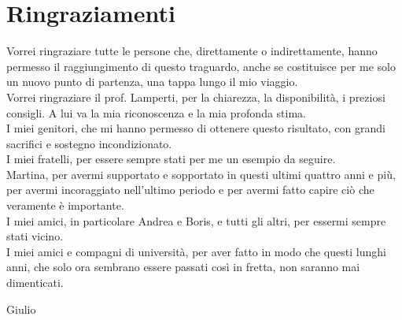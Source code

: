 \chapter*{Ringraziamenti}
Vorrei ringraziare tutte le persone che, direttamente o indirettamente, hanno permesso il raggiungimento di questo traguardo, anche se costituisce per me solo un nuovo punto di partenza, una tappa lungo il mio viaggio.\\
Vorrei ringraziare il prof. Lamperti, per la chiarezza, la disponibilità, i preziosi consigli. A lui va la mia riconoscenza e la mia profonda stima.\\
I miei genitori, che mi hanno permesso di ottenere questo risultato, con grandi sacrifici e sostegno incondizionato.\\ 
I miei fratelli, per essere sempre stati per me un esempio da seguire.\\
Martina, per avermi supportato e sopportato in questi ultimi quattro anni e più, per avermi incoraggiato nell'ultimo periodo e per avermi fatto capire ciò che veramente è importante.\\
I miei amici, in particolare Andrea e Boris, e tutti gli altri, per essermi sempre stati vicino.\\
I miei amici e compagni di università, per aver fatto in modo che questi lunghi anni, che solo ora sembrano essere passati così in fretta, non saranno mai dimenticati. 

\begin{flushright}Giulio\end{flushright}